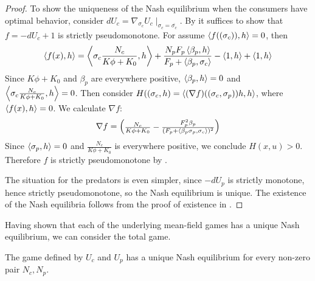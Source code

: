 \begin{proof}
  To show the uniqueness of the Nash equilibrium when the consumers have optimal behavior, consider $dU_c = \nabla_{\sigma_c} U_c \mid_{\sigma_c = \overbar{\sigma_c}}$.  By  it suffices to show that $f = -dU_c + 1$ is strictly pseudomonotone.
  For  assume $\left \langle f((\sigma_c)),h \right \rangle = 0$, then
  \begin{equation}
    \begin{split}
      \ip{f(x)}{h} = \ip{\sigma_c \frac{N_c}{K\phi + K_0} }{h} + \frac{N_p F_p \ip{\beta_p }{h}}{F_p + \ip{\beta_p}{\sigma_c}} - \ip{1}{h} + \ip{1}{h}
    \end{split}
  \end{equation}
  Since $K\phi + K_0$ and $\beta_p$ are everywhere positive, $\left \langle \beta_p,h \right \rangle = 0$ and $\ip{\sigma_c \frac{N_c}{K\phi + K_0}}{h} = 0$. Then consider $H((\sigma_c,h)= \left \langle (\nabla f)((\sigma_c,\sigma_p))h,h \right \rangle$, where $\left \langle f(x),h \right \rangle = 0$. We calculate $\nabla f$:
    \begin{equation}
      \nabla f = \begin{pmatrix} \frac{N_c}{K \phi + K_0} - \frac{F_p^2\beta_p}{(F_p + \ip{\beta_p \sigma_p}{\sigma_c})^2} \\
    \end{pmatrix}
    \end{equation}
    Since $\left \langle \sigma_p,h \right \rangle=0$ and $\frac{N_c}{K\phi + K_0}$ is everywhere positive, we conclude $H(x,u)>0$. Therefore $f$ is strictly pseudomonotone by .

    The situation for the predators is even simpler, since $-dU_p$ is strictly monotone, hence strictly pseudomonotone, so the Nash equilibrium is unique.
    The existence of the Nash equilibria follows from the proof of existence in .
\end{proof}
Having shown that each of the underlying mean-field games has a unique Nash equilibrium, we can consider the total game.
\begin{proposition}
  \label{prop:exist_unique_nash}
  The game defined by $U_c$ and $U_p$ has a unique Nash equilibrium for every non-zero pair $N_c,N_p$.
\end{proposition}
